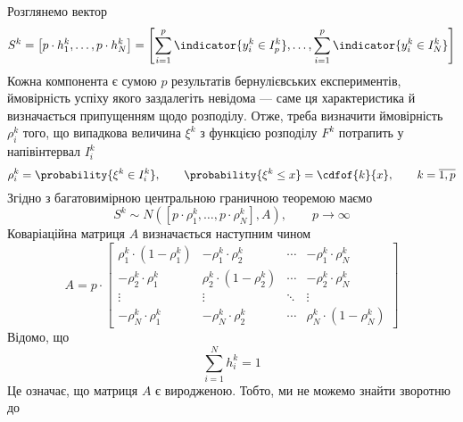 Розглянемо вектор
\begin{equation*}
  S^k
  = \left[ p \cdot h_1^k, \dots, p \cdot h_N^k \right]
  = \left[ \sum_{i=1}^{p} \indicator{y_i^k \in I_p^k}, \dots,
    \sum_{i=1}^{p} \indicator{y_i^k \in I_N^k} \right]
\end{equation*}
Кожна компонента є сумою $p$ результатів бернулієвських експериментів, ймовірність
успіху якого заздалегіть невідома --- саме ця характеристика й визначається
припущенням щодо розподілу.
Отже, треба визначити ймовірність $\rho_i^k$ того, що випадкова величина
$\xi^k$ з функцією розподілу $F^k$ потрапить у напівінтервал $I_i^k$
\begin{equation*}
  \rho_i^k = \probability{\xi^k \in I_i^k},
  \qquad \probability{\xi^k \le x} = \cdfof{k}{x},
  \qquad k = \overline{1,p}
\end{equation*}
Згідно з багатовимірною центральною граничною теоремою маємо
\begin{equation*}
  S^k
  \sim N\left( \left[ p \cdot \rho_1^k, \dots, p \cdot \rho_N^k \right],
    A \right),
  \qquad p\to\infty
\end{equation*}
Коваріаційна матриця $A$ визначається наступним чином
\begin{equation*}
  A = p \cdot
    \begin{bmatrix}
      \rho_1^k \cdot \left( 1 - \rho_1^k \right) & - \rho_1^k \cdot \rho_2^k
                                      & \cdots & - \rho_1^k \cdot \rho_N^k \\
      - \rho_2^k \cdot \rho_1^k                  & \rho_2^k \cdot
          \left( 1 - \rho_2^k \right) & \cdots & - \rho_2^k \cdot \rho_N^k \\
      \vdots                                     & \vdots
                                      & \ddots & \vdots \\
       - \rho_N^k \cdot \rho_1^k                 & - \rho_N^k \cdot \rho_2^k
                                      & \cdots & \rho_N^k \cdot \left( 1 - \rho_N^k \right)
    \end{bmatrix}
\end{equation*}
Відомо, що 
\begin{equation*}
  \sum_{i=1}^{N} h_i^k = 1
\end{equation*}
Це означає, що матриця $A$ є виродженою. Тобто, ми не можемо знайти зворотню до
